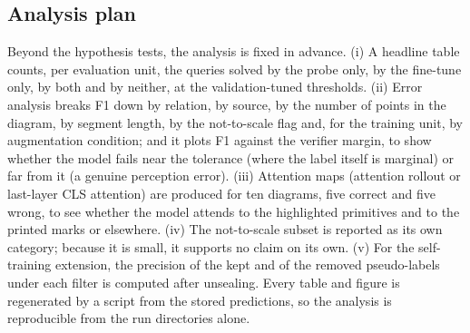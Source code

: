 \subsection{Analysis plan}

Beyond the hypothesis tests, the analysis is fixed in advance. (i) A headline table counts, per evaluation unit, the queries solved by the probe only, by the fine-tune only, by both and by neither, at the validation-tuned thresholds. (ii) Error analysis breaks F1 down by relation, by source, by the number of points in the diagram, by segment length, by the not-to-scale flag and, for the training unit, by augmentation condition; and it plots F1 against the verifier margin, to show whether the model fails near the tolerance (where the label itself is marginal) or far from it (a genuine perception error). (iii) Attention maps (attention rollout or last-layer CLS attention) are produced for ten diagrams, five correct and five wrong, to see whether the model attends to the highlighted primitives and to the printed marks or elsewhere. (iv) The not-to-scale subset is reported as its own category; because it is small, it supports no claim on its own. (v) For the self-training extension, the precision of the kept and of the removed pseudo-labels under each filter is computed after unsealing. Every table and figure is regenerated by a script from the stored predictions, so the analysis is reproducible from the run directories alone.
